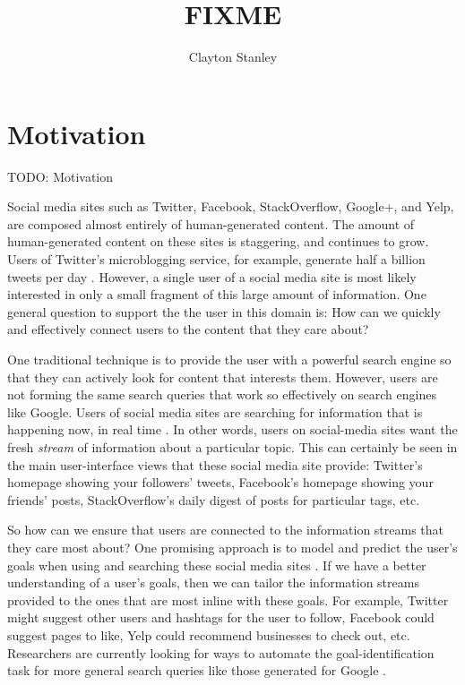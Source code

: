 \documentclass[man]{apa6}
\title{FIXME}
\author{Clayton Stanley}
\affiliation{Rice University}
\begin{document}
\maketitle

\tableofcontents
\newpage

\section{Motivation}

TODO: Motivation

Social media sites such as Twitter, Facebook, StackOverflow, Google+, and Yelp, are composed almost entirely of human-generated content.
The amount of human-generated content on these sites is staggering, and continues to grow.
Users of Twitter's microblogging service, for example, generate half a billion tweets per day \parencite{TwitterReport2012}.
However, a single user of a social media site is most likely interested in only a small fragment of this large amount of information.
One general question to support the the user in this domain is:
How can we quickly and effectively connect users to the content that they care about?

One traditional technique is to provide the user with a powerful search engine so that they can actively look for content that interests them.
However, users are not forming the same search queries that work so effectively on search engines like Google.
Users of social media sites are searching for information that is happening now, in real time \parencite{Bauer2012}.
In other words, users on social-media sites want the fresh \emph{stream} of information about a particular topic.
This can certainly be seen in the main user-interface views that these social media site provide:
Twitter's homepage showing your followers' tweets, Facebook's homepage showing your friends' posts, StackOverflow's daily digest of posts for particular tags, etc.

So how can we ensure that users are connected to the information streams that they care most about?
One promising approach is to model and predict the user's goals when using and searching these social media sites \parencite{Rose2004}.
If we have a better understanding of a user's goals, then we can tailor the information streams provided to the ones that are most inline with these goals.
For example, Twitter might suggest other users and hashtags for the user to follow, Facebook could suggest pages to like, Yelp could recommend businesses to check out, etc.
Researchers are currently looking for ways to automate the goal-identification task for more general search queries like those generated for Google \parencites{Jansen2008}{Lee2005}.
\end{document}
